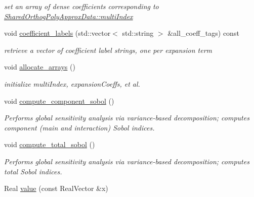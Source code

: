 \begin{DoxyCompactItemize}
\begin{DoxyCompactList}\small\item\em set an array of dense coefficients corresponding to \hyperlink{classPecos_1_1SharedOrthogPolyApproxData_a0fbdd5817bc6dd026f6d42269ca8e703}{Shared\+Orthog\+Poly\+Approx\+Data\+::multi\+Index} \end{DoxyCompactList}\item 
void \hyperlink{classPecos_1_1OrthogPolyApproximation_acbb94332d149ea052464dac73321ddcf}{coefficient\+\_\+labels} (std\+::vector$<$ std\+::string $>$ \&all\+\_\+coeff\+\_\+tags) const \label{classPecos_1_1OrthogPolyApproximation_acbb94332d149ea052464dac73321ddcf}

\begin{DoxyCompactList}\small\item\em retrieve a vector of coefficient label strings, one per expansion term \end{DoxyCompactList}\item 
void \hyperlink{classPecos_1_1OrthogPolyApproximation_a37ef37829b412fefa40d53b395846781}{allocate\+\_\+arrays} ()\label{classPecos_1_1OrthogPolyApproximation_a37ef37829b412fefa40d53b395846781}

\begin{DoxyCompactList}\small\item\em initialize multi\+Index, expansion\+Coeffs, et al. \end{DoxyCompactList}\item 
void \hyperlink{classPecos_1_1OrthogPolyApproximation_abec3f45a112004b53f83b3a03e0d06db}{compute\+\_\+component\+\_\+sobol} ()\label{classPecos_1_1OrthogPolyApproximation_abec3f45a112004b53f83b3a03e0d06db}

\begin{DoxyCompactList}\small\item\em Performs global sensitivity analysis via variance-\/based decomposition; computes component (main and interaction) Sobol\textquotesingle{} indices. \end{DoxyCompactList}\item 
void \hyperlink{classPecos_1_1OrthogPolyApproximation_ada0deadfa2c3202ed4e58d066ee079f2}{compute\+\_\+total\+\_\+sobol} ()\label{classPecos_1_1OrthogPolyApproximation_ada0deadfa2c3202ed4e58d066ee079f2}

\begin{DoxyCompactList}\small\item\em Performs global sensitivity analysis via variance-\/based decomposition; computes total Sobol\textquotesingle{} indices. \end{DoxyCompactList}\item 
Real \hyperlink{classPecos_1_1OrthogPolyApproximation_a7bc9dcdf32fc46f97e286268c1ac51b0}{value} (const Real\+Vector \&x)\label{classPecos_1_1OrthogPolyApproximation_a7bc9dcdf32fc46f97e286268c1ac51b0}


\end{DoxyCompactItemize}
